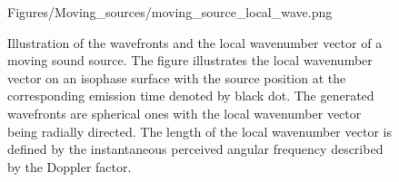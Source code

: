 \begin{figure} 
	\small
    \begin{minipage}[c]{0.6\textwidth}
    \hspace{0cm}
	\begin{overpic}[width = 1.0\columnwidth ]{Figures/Moving_sources/moving_source_local_wave.png}
	\small
	\end{overpic} 
	\end{minipage}
	\hspace{10mm}
	\begin{minipage}[c]{0.35\textwidth}
    \caption{
	Illustration of the wavefronts and the local wavenumber vector of a moving sound source.
	The figure illustrates the local wavenumber vector on an isophase surface with the source position at the corresponding emission time denoted by black dot.
	The generated wavefronts are spherical ones with the local wavenumber vector being radially directed.
	The length of the local wavenumber vector is defined by the instantaneous perceived angular frequency described by the Doppler factor.}
	\label{Fig:Moving_source:moving_source_local_wn}
	\end{minipage}
\end{figure}  

